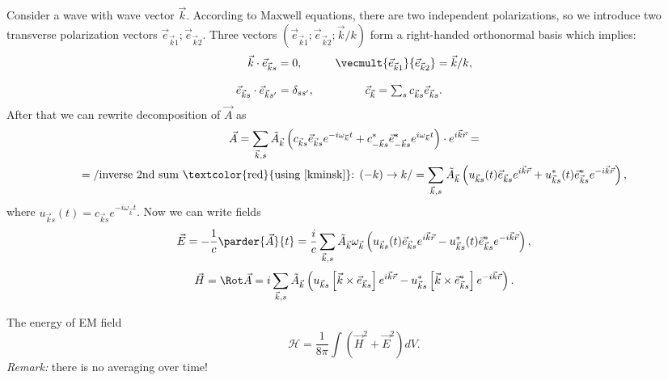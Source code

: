 	Consider a wave with wave vector $\vec{k}$. According to Maxwell equations, there are two independent polarizations, so we introduce two transverse polarization vectors $\vec{e}_{\vec{k}1}; \vec{e}_{\vec{k}2}$. Three vectors $(\vec{e}_{\vec{k}1}; \vec{e}_{\vec{k}2}; \vec{k}/k)$ form a right-handed orthonormal basis which implies:
	\begin{equation}
		\begin{matrix}
			\vec{k} \cdot \vec{e}_{\vec{k}s} = 0, && \vecmult{\vec{e}_{\vec{k}1}}{\vec{e}_{\vec{k}2}} = \vec{k}/k, \\ \\
			\vec{e}_{\vec{k}s} \cdot \vec{e}_{\vec{k}s'} = \delta_{ss'}, && \vec{c}_{\vec{k}} = \sum_s c_{\vec{k}s} \vec{e}_{\vec{k}s}.
		\end{matrix}
	\end{equation}
	After that we can rewrite decomposition of $\vec{A}$ as
	\begin{multline}
		\vec{A} = \sum_{\vec{k},s} \tilde{A}_{\vec{k}} \left( c_{\vec{k}s} \vec{e}_{\vec{k}s} e^{-i \omega_{\vec{k}} t} + c^*_{-\vec{k}s} \vec{e}^*_{-\vec{k}s}  e^{i \omega_{\vec{k}} t} \right) \cdot e^{i \vec{k} \vec{r}} = \\
		= \left/ \text{inverse 2nd sum \textcolor{red}{using \eqref{kminsk}}: } (-k) \to k \right/ =\sum_{\vec{k},s} \tilde{A}_{\vec{k}} \left( u_{\vec{k}s}(t) \vec{e}_{\vec{k}s} e^{i \vec{k} \vec{r}} + u^*_{\vec{k}s}(t) \vec{e}^*_{\vec{k}s}  e^{-i \vec{k} \vec{r}} \right),
	\end{multline}
	where $u_{\vec{k}s}(t) = c_{\vec{k}s} e^{-i \omega_{\vec{k}} t}$. Now we can write fields
	\begin{equation}
		\vec{E} = -\frac{1}{c} \parder{\vec{A}}{t} = \frac{i}{c} \sum_{\vec{k},s} \tilde{A}_{\vec{k}} \omega_{\vec{k}} \left( u_{\vec{k}s}(t) \vec{e}_{\vec{k}s} e^{i \vec{k} \vec{r}} - u^*_{\vec{k}s}(t) \vec{e}^*_{\vec{k}s}  e^{-i \vec{k} \vec{r}} \right),
	\end{equation}
	\begin{equation}
		\vec{H} = \Rot \vec{A} = i \sum_{\vec{k},s} \tilde{A}_{\vec{k}} \left( u_{\vec{k}s} \left[ \vec{k} \times \vec{e}_{\vec{k}s} \right] e^{i \vec{k} \vec{r}} - u^*_{\vec{k}s} \left[ \vec{k} \times \vec{e}^*_{\vec{k}s} \right] e^{-i \vec{k} \vec{r}} \right).
	\end{equation}
	
	The energy of EM field
	\begin{equation}
		\mathscr{H} = \frac{1}{8 \pi} \int \left(\vec{H}^2 + \vec{E}^2 \right) dV.
	\end{equation} 
	\textit{Remark:} there is no averaging over time!
	
